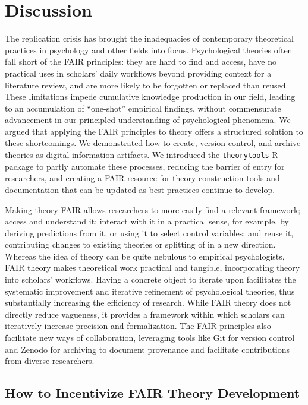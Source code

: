 \documentclass[
  man, noextraspace,floatsintext]{apa6}
\begin{document}
\section{Discussion}\label{discussion}

The replication crisis has brought the inadequacies of contemporary theoretical practices in psychology and other fields into focus.
Psychological theories often fall short of the FAIR principles:
they are hard to find and access, have no practical uses in scholars' daily workflows beyond providing context for a literature review,
and are more likely to be forgotten or replaced than reused.
These limitations impede cumulative knowledge production in our field,
leading to an accumulation of ``one-shot'' empirical findings, without commensurate advancement in our principled understanding of psychological phenomena.
We argued that applying the FAIR principles to theory offers a structured solution to these shortcomings.
We demonstrated how to create, version-control, and archive theories as digital information artifacts.
We introduced the \texttt{theorytools} R-package to partly automate these processes, reducing the barrier of entry for researchers,
and creating a FAIR resource for theory construction tools and documentation that can be updated as best practices continue to develop.

Making theory FAIR allows researchers to more easily find a relevant framework;
access and understand it; interact with it in a practical sense, for example, by deriving predictions from it, or using it to select control variables; and reuse it, contributing changes to existing theories or splitting of in a new direction.
Whereas the idea of theory can be quite nebulous to empirical psychologists,
FAIR theory makes theoretical work practical and tangible, incorporating theory into scholars' workflows.
Having a concrete object to iterate upon facilitates the systematic improvement and iterative refinement of psychological theories, thus substantially increasing the efficiency of research.
While FAIR theory does not directly reduce vagueness,
it provides a framework within which scholars can iteratively increase precision and formalization.
The FAIR principles also facilitate new ways of collaboration,
leveraging tools like Git for version control and Zenodo for archiving to document provenance and facilitate contributions from diverse researchers.

\subsection{How to Incentivize FAIR Theory Development}\label{how-to-incentivize-fair-theory-development}
\end{document}
